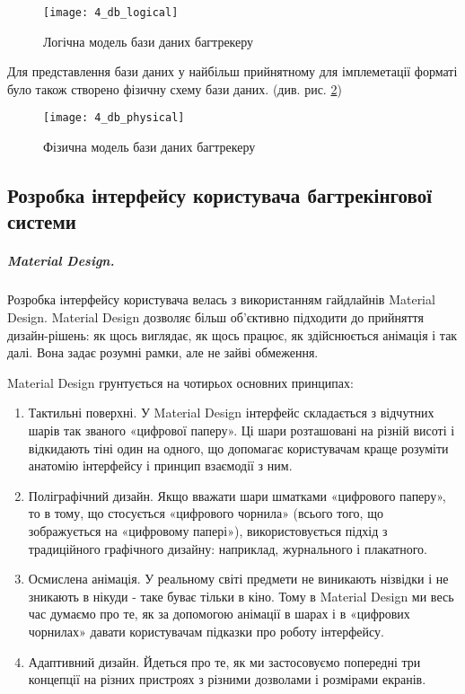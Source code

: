 \documentclass[../main.tex]{subfiles}
\begin{document}
		\begin{figure}[H]
			\centering
			\texttt{[image: 4\_db\_logical]}
			\caption{Логічна модель бази даних багтрекеру}
			\label{db_logical}
		\end{figure}
		
		Для представлення бази даних у найбільш прийнятному для імплеметації форматі було також створено фізичну схему бази даних. (див. рис. \ref{db_physical})
		
		\begin{figure}[H]
			\centering
			\texttt{[image: 4\_db\_physical]}
			\caption{Фізична модель бази даних багтрекеру}
			\label{db_physical}
		\end{figure}
	
	\subsection{Розробка інтерфейсу користувача багтрекінгової системи}
		\subparagraph{Material Design.}
		
			Розробка інтерфейсу користувача велась з використанням гайдлайнів Material Design.\cite{material_design} Material Design дозволяє більш об'єктивно підходити до прийняття дизайн-рішень: як щось виглядає, як щось працює, як здійснюється анімація і так далі. Вона задає розумні рамки, але не зайві обмеження.
			
			Material Design грунтується на чотирьох основних принципах:
			\begin{enumerate}
				\item Тактильні поверхні. У Material Design інтерфейс складається з відчутних шарів так званого «цифрової паперу». Ці шари розташовані на різній висоті і відкидають тіні один на одного, що допомагає користувачам краще розуміти анатомію інтерфейсу і принцип взаємодії з ним.
				\item Поліграфічний дизайн. Якщо вважати шари шматками «цифрового паперу», то в тому, що стосується «цифрового чорнила» (всього того, що зображується на «цифровому папері»), використовується підхід з традиційного графічного дизайну: наприклад, журнального і плакатного.
				\item Осмислена анімація. У реальному світі предмети не виникають нізвідки і не зникають в нікуди - таке буває тільки в кіно. Тому в Material Design ми весь час думаємо про те, як за допомогою анімації в шарах і в «цифрових чорнилах» давати користувачам підказки про роботу інтерфейсу.
				\item Адаптивний дизайн. Йдеться про те, як ми застосовуємо попередні три концепції на різних пристроях з різними дозволами і розмірами екранів.
			\end{enumerate}
			
\end{document}
